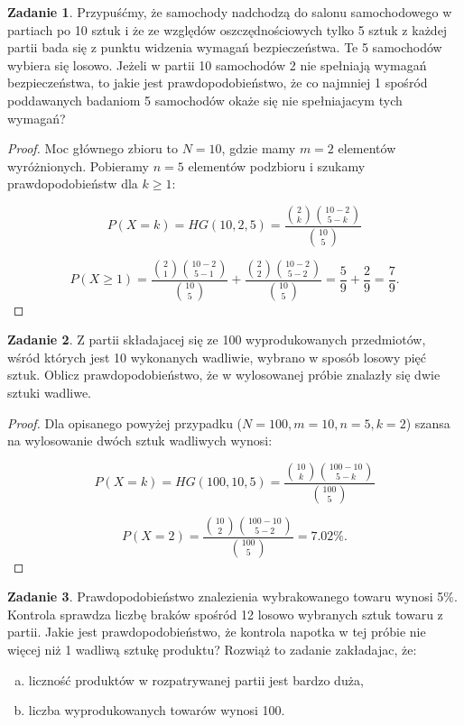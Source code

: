 \documentclass[11pt]{article}
\theoremstyle{definition}
\newtheorem{zadanie}{Zadanie}
\numberwithin{zadanie}{section}
\begin{document}
\begin{zadanie}
    Przypuśćmy, że samochody nadchodzą do salonu samochodowego w partiach po 10 sztuk i że ze względów oszczędnościowych tylko 5 sztuk z każdej partii bada się z punktu widzenia
    wymagań bezpieczeństwa. Te 5 samochodów wybiera się losowo. Jeżeli w partii 10 samochodów 2 nie spełniają wymagań bezpieczeństwa, to jakie jest prawdopodobieństwo, że co najmniej
    1 spośród poddawanych badaniom 5 samochodów okaże się nie spełniajacym tych wymagań?
\end{zadanie}
\begin{proof}
    Moc głównego zbioru to $N=10$, gdzie mamy $m=2$ elementów wyróżnionych. Pobieramy $n=5$ elementów podzbioru i szukamy prawdopodobieństw dla $k\geq1$:

    $$P(X=k)= HG(10,2,5) = \frac{\binom {2}{k}\binom{10-2}{5-k}}{\binom{10}{5}}$$

    $$P(X\geq 1)= \frac{\binom {2}{1}\binom{10-2}{5-1}}{\binom{10}{5}}+\frac{\binom {2}{2}\binom{10-2}{5-2}}{\binom{10}{5}} =\frac59+\frac29=\frac79. $$

\end{proof}
\begin{zadanie}
    Z partii składajacej się ze 100 wyprodukowanych przedmiotów, wśród których jest
    10 wykonanych wadliwie, wybrano w sposób losowy pięć sztuk.
    Oblicz prawdopodobieństwo, że w wylosowanej próbie znalazły się dwie sztuki wadliwe.
\end{zadanie}
\begin{proof}
    Dla opisanego powyżej przypadku ($N=100, m=10, n=5, k=2$) szansa na wylosowanie dwóch sztuk wadliwych wynosi:

    $$P(X=k) = HG(100,10,5) = \frac{\binom {10}k\binom{100-10}{5-k}}{\binom{100}5}$$

    $$P(X=2) = \frac{\binom {10}2\binom{100-10}{5-2}}{\binom{100}5}  = 7.02\% .$$

\end{proof}
\begin{zadanie}
    Prawdopodobieństwo znalezienia wybrakowanego towaru wynosi 5\%. Kontrola sprawdza liczbę braków spośród 12
    losowo wybranych sztuk towaru z partii. Jakie jest prawdopodobieństwo, że kontrola napotka w tej próbie nie więcej
    niż 1 wadliwą sztukę produktu? Rozwiąż to zadanie zakładajac, że:

    \begin{enumerate}[a)]
        \item liczność produktów w rozpatrywanej partii jest bardzo duża,
        \item liczba wyprodukowanych towarów wynosi 100.
    \end{enumerate}
\end{zadanie}
\end{document}
